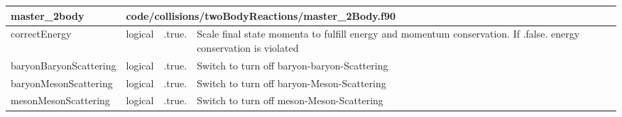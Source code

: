 \documentclass{article}
\begin{document}
\begin{longtable}{llll}
\bottomrule
\end{longtable}
{ }




\begin{longtable}{llll}
\toprule
\textbf{\large{master\_2body}} & \multicolumn{3}{l}{\footnotesize{code/collisions/twoBodyReactions/master\_2Body.f90}}\\*
\midrule
\endfirsthead
\midrule
\endhead
correctEnergy & \begin{minipage}[t]{2cm}logical\end{minipage} & \begin{minipage}[t]{2cm}.true.\end{minipage} & \begin{minipage}[t]{12cm}Scale final state momenta to fulfill energy and momentum conservation. If .false. energy conservation is violated\end{minipage}\\*
\midrule
baryonBaryonScattering & \begin{minipage}[t]{2cm}logical\end{minipage} & \begin{minipage}[t]{2cm}.true.\end{minipage} & \begin{minipage}[t]{12cm}Switch to turn off baryon-baryon-Scattering\end{minipage}\\*
\midrule
baryonMesonScattering & \begin{minipage}[t]{2cm}logical\end{minipage} & \begin{minipage}[t]{2cm}.true.\end{minipage} & \begin{minipage}[t]{12cm}Switch to turn off baryon-Meson-Scattering\end{minipage}\\*
\midrule
mesonMesonScattering & \begin{minipage}[t]{2cm}logical\end{minipage} & \begin{minipage}[t]{2cm}.true.\end{minipage} & \begin{minipage}[t]{12cm}Switch to turn off meson-Meson-Scattering\end{minipage}\\*
\midrule

\end{longtable}
\end{document}
